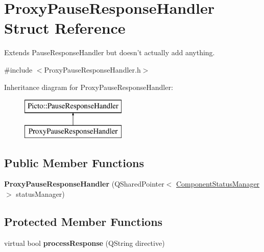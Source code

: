 \hypertarget{struct_proxy_pause_response_handler}{\section{Proxy\-Pause\-Response\-Handler Struct Reference}
\label{struct_proxy_pause_response_handler}
}


Extends Pause\-Response\-Handler but doesn't actually add anything.  




{\ttfamily \#include $<$Proxy\-Pause\-Response\-Handler.\-h$>$}

Inheritance diagram for Proxy\-Pause\-Response\-Handler\-:\begin{figure}[H]
\begin{center}
\leavevmode
\includegraphics[height=2.000000cm]{struct_proxy_pause_response_handler}
\end{center}
\end{figure}
\subsection*{Public Member Functions}
\begin{DoxyCompactItemize}
\item 
\hypertarget{struct_proxy_pause_response_handler_aab86678a45c174df31709a24aedf47f6}{{\bfseries Proxy\-Pause\-Response\-Handler} (Q\-Shared\-Pointer$<$ \hyperlink{class_component_status_manager}{Component\-Status\-Manager} $>$ status\-Manager)}\label{struct_proxy_pause_response_handler_aab86678a45c174df31709a24aedf47f6}

\end{DoxyCompactItemize}
\subsection*{Protected Member Functions}
\begin{DoxyCompactItemize}
\item 
\hypertarget{struct_proxy_pause_response_handler_a8392bec0d5ea113e506d70242fbe6764}{virtual bool {\bfseries process\-Response} (Q\-String directive)}\label{struct_proxy_pause_response_handler_a8392bec0d5ea113e506d70242fbe6764}

\end{DoxyCompactItemize}


